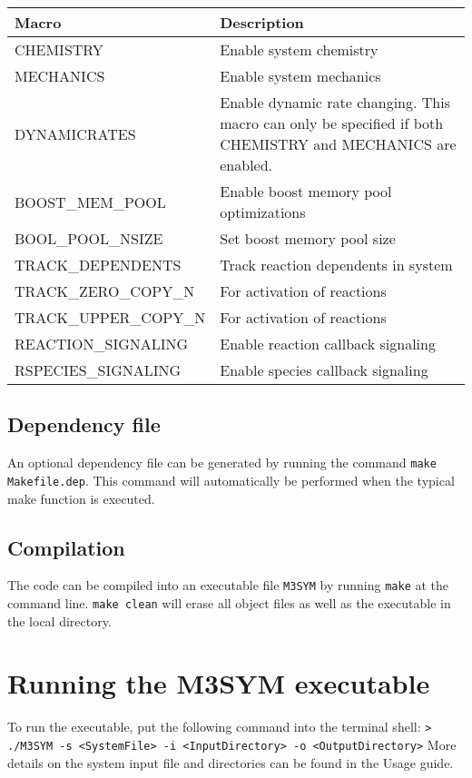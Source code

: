 \documentclass[11pt, oneside]{article}   	%
\begin{document}
\small
\begin{table} [!ht]
\centering
\begin{tabular}{|L{5cm}|L{7.5cm}|}  
\hline
 \textbf{Macro} & \textbf{Description} \\
 \hline
  CHEMISTRY & Enable system chemistry \\
  \hline
  MECHANICS & Enable system mechanics \\ 
  \hline
  DYNAMICRATES & Enable dynamic rate changing. This macro can only be specified if both CHEMISTRY and
  MECHANICS are enabled. \\
  \hline
  BOOST\_MEM\_POOL & Enable boost memory pool optimizations \\
  \hline
   BOOL\_POOL\_NSIZE & Set boost memory pool size \\
  \hline
   TRACK\_DEPENDENTS & Track reaction dependents in system \\
  \hline
    TRACK\_ZERO\_COPY\_N & For activation of reactions \\
  \hline
     TRACK\_UPPER\_COPY\_N & For activation of reactions \\
  \hline
     REACTION\_SIGNALING & Enable reaction callback signaling \\
  \hline
     RSPECIES\_SIGNALING & Enable species callback signaling\\
  \hline
\end{tabular}
\end{table}
\normalsize

	
\subsection {Dependency file}

An optional dependency file can be generated by running the command  \texttt{make Makefile.dep}. This command will automatically be performed when the typical make function is executed.

\subsection{Compilation}

The code can be compiled into an executable file \texttt{M3SYM} by running \texttt{make} at the command line. \texttt{make clean} will erase all object files as well as the executable in the local directory.

\section {Running the M3SYM executable}

To run the executable, put the following command into the terminal shell: \newline \newline\indent \texttt{> ./M3SYM -s <SystemFile> -i <InputDirectory> -o <OutputDirectory>} \newline \newline More details on the system input file and directories can be found in the Usage guide.
\end{document}
